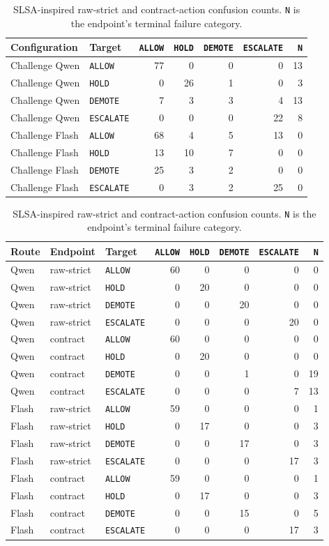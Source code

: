 \documentclass[10pt]{article}
\newcommand{\allow}{\texttt{ALLOW}}
\newcommand{\hold}{\texttt{HOLD}}
\newcommand{\demote}{\texttt{DEMOTE}}
\newcommand{\escalate}{\texttt{ESCALATE}}
\begin{document}
\begin{table}[H]
\centering
\footnotesize
\setlength{\tabcolsep}{3.5pt}
\caption{Balanced-challenge raw-strict action confusion counts. \texttt{N} marks a
terminal extraction failure.}
\label{tab:challenge-strict-confusion}
\begin{tabular}{@{}llrrrrr@{}}
\toprule
Configuration & Target & \allow{} & \hold{} & \demote{} & \escalate{} & \texttt{N} \\
\midrule
Challenge Qwen & \allow{} & 77 & 0 & 0 & 0 & 13 \\
Challenge Qwen & \hold{} & 0 & 26 & 1 & 0 & 3 \\
Challenge Qwen & \demote{} & 7 & 3 & 3 & 4 & 13 \\
Challenge Qwen & \escalate{} & 0 & 0 & 0 & 22 & 8 \\
\midrule
Challenge Flash & \allow{} & 68 & 4 & 5 & 13 & 0 \\
Challenge Flash & \hold{} & 13 & 10 & 7 & 0 & 0 \\
Challenge Flash & \demote{} & 25 & 3 & 2 & 0 & 0 \\
Challenge Flash & \escalate{} & 0 & 3 & 2 & 25 & 0 \\
\bottomrule
\end{tabular}
\par\bigskip
\caption{SLSA-inspired raw-strict and contract-action confusion counts. \texttt{N} is the endpoint's
terminal failure category.}
\label{tab:slsa-confusion}
\begin{tabular}{@{}lllrrrrr@{}}
\toprule
Route & Endpoint & Target & \allow{} & \hold{} & \demote{} & \escalate{} & \texttt{N} \\
\midrule
Qwen & raw-strict & \allow{} & 60&0&0&0&0 \\
Qwen & raw-strict & \hold{} & 0&20&0&0&0 \\
Qwen & raw-strict & \demote{} & 0&0&20&0&0 \\
Qwen & raw-strict & \escalate{} & 0&0&0&20&0 \\
Qwen & contract & \allow{} & 60&0&0&0&0 \\
Qwen & contract & \hold{} & 0&20&0&0&0 \\
Qwen & contract & \demote{} & 0&0&1&0&19 \\
Qwen & contract & \escalate{} & 0&0&0&7&13 \\
\midrule
Flash & raw-strict & \allow{} & 59&0&0&0&1 \\
Flash & raw-strict & \hold{} & 0&17&0&0&3 \\
Flash & raw-strict & \demote{} & 0&0&17&0&3 \\
Flash & raw-strict & \escalate{} & 0&0&0&17&3 \\
Flash & contract & \allow{} & 59&0&0&0&1 \\
Flash & contract & \hold{} & 0&17&0&0&3 \\
Flash & contract & \demote{} & 0&0&15&0&5 \\
Flash & contract & \escalate{} & 0&0&0&17&3 \\
\bottomrule
\end{tabular}
\end{table}
\end{document}
